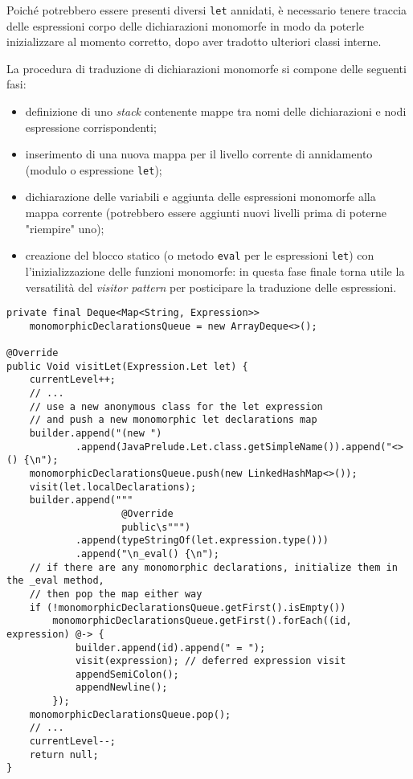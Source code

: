 \newpage

\noindent Poiché potrebbero essere presenti diversi \texttt{let} annidati, è necessario tenere traccia delle espressioni
corpo delle dichiarazioni monomorfe in modo da poterle inizializzare al momento corretto, dopo aver tradotto ulteriori classi interne.

\noindent La procedura di traduzione di dichiarazioni monomorfe si compone delle seguenti fasi:
\begin{itemize}
    \item definizione di uno \textit{stack} contenente mappe tra nomi delle dichiarazioni e nodi espressione corrispondenti;
    \item inserimento di una nuova mappa per il livello corrente di annidamento (modulo o espressione \texttt{let});
    \item dichiarazione delle variabili e aggiunta delle espressioni monomorfe
          alla mappa corrente (potrebbero essere aggiunti nuovi livelli prima di poterne "riempire" uno);
    \item creazione del blocco statico (o metodo \texttt{eval} per le espressioni \texttt{let}) con l'inizializzazione
          delle funzioni monomorfe: in questa fase finale torna utile la versatilità del \textit{visitor pattern} per posticipare
          la traduzione delle espressioni.
\end{itemize}

\vspace{4mm}
\begin{lstlisting}[caption={Traduzione di funzioni monomorfe in \texttt{let}}, style=javaCode, label={lst:5-13-monomorphic-translation-java}]
private final Deque<Map<String, Expression>>
    monomorphicDeclarationsQueue = new ArrayDeque<>();

@Override
public Void visitLet(Expression.Let let) {
    currentLevel++;
    // ...
    // use a new anonymous class for the let expression
    // and push a new monomorphic let declarations map
    builder.append("(new ")
            .append(JavaPrelude.Let.class.getSimpleName()).append("<>() {\n");
    monomorphicDeclarationsQueue.push(new LinkedHashMap<>());
    visit(let.localDeclarations);
    builder.append("""
                    @Override
                    public\s""")
            .append(typeStringOf(let.expression.type()))
            .append("\n_eval() {\n");
    // if there are any monomorphic declarations, initialize them in the _eval method,
    // then pop the map either way
    if (!monomorphicDeclarationsQueue.getFirst().isEmpty())
        monomorphicDeclarationsQueue.getFirst().forEach((id, expression) @-> {
            builder.append(id).append(" = ");
            visit(expression); // deferred expression visit
            appendSemiColon();
            appendNewline();
        });
    monomorphicDeclarationsQueue.pop();
    // ...
    currentLevel--;
    return null;
}
\end{lstlisting}

